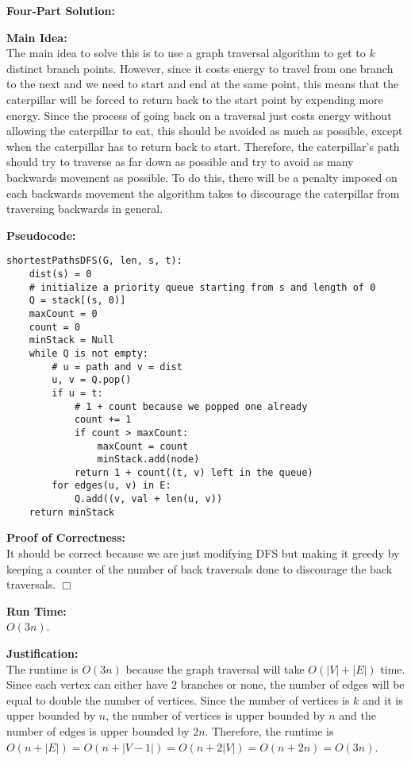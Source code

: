 \documentclass[11pt]{article}
\def\endproofmark{$\Box$}
\newenvironment{FourPartSolution}{\par{\bf Four-Part Solution:}}{\smallskip}
\newenvironment{mainIdea}{\par{\bf Main Idea:}}{\smallskip}
\newenvironment{pseudocode}{\par{\bf Pseudocode:}}{\smallskip}
\newenvironment{proofOfCorrectness}{\par{\bf Proof of Correctness:}}{\endproofmark\smallskip}
\newenvironment{runTime}{\par{\bf Run Time:}}{\smallskip}
\newenvironment{justification}{\par{\bf Justification:}}{\smallskip}
\begin{document}
\begin{FourPartSolution}
\\
\begin{mainIdea}
\\
The main idea to solve this is to use a graph traversal algorithm to get to $k$ distinct branch points. However, since it costs energy to travel from one branch to the next and we need to start and end at the same point, this means that the caterpillar will be forced to return back to the start point by expending more energy. Since the process of going back on a traversal just costs energy without allowing the caterpillar to eat, this should be avoided as much as possible, except when the caterpillar has to return back to start. Therefore, the caterpillar's path should try to traverse as far down as possible and try to avoid as many backwards movement as possible. To do this, there will be a penalty imposed on each backwards movement the algorithm takes to discourage the caterpillar from traversing backwards in general.
\end{mainIdea}
\\
\begin{pseudocode}
\begin{lstlisting}
shortestPathsDFS(G, len, s, t):
	dist(s) = 0
	# initialize a priority queue starting from s and length of 0
	Q = stack[(s, 0)]
	maxCount = 0
	count = 0
	minStack = Null
	while Q is not empty:
		# u = path and v = dist
		u, v = Q.pop()
		if u = t:
			# 1 + count because we popped one already
			count += 1
			if count > maxCount:
				maxCount = count
				minStack.add(node)
			return 1 + count((t, v) left in the queue)
		for edges(u, v) in E:
			Q.add((v, val + len(u, v))
	return minStack

\end{lstlisting}
\end{pseudocode}
\begin{proofOfCorrectness}
\\
It should be correct because we are just modifying DFS but making it greedy by keeping a counter of the number of back traversals done to discourage the back traversals. 
\end{proofOfCorrectness}
\\
\begin{runTime}
\\
$O(3n)$.
\end{runTime}
\\
\begin{justification}
\\
The runtime is $O(3n)$ because the graph traversal will take $O(|V| + |E|)$ time. Since each vertex can either have $2$ branches or none, the number of edges will be equal to double the number of vertices. Since the number of vertices is $k$ and it is upper bounded by $n$, the number of vertices is upper bounded by $n$ and the number of edges is upper bounded by $2n$. Therefore, the runtime is $O(n + |E|) = O(n + |V - 1|) = O(n + 2|V|) = O(n + 2n) = O(3n)$.
\end{justification}
\end{FourPartSolution}
\end{document}
